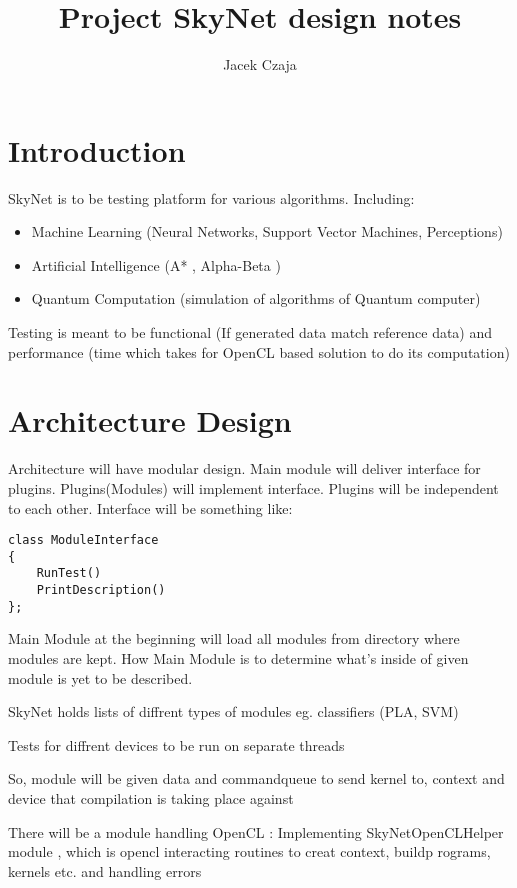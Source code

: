 \documentclass[a4paper,10pt]{article}
\title{Project SkyNet design notes}
\author{Jacek Czaja}
\begin{document}
\maketitle

\tableofcontents

\section{Introduction}
SkyNet is to be testing platform for various algorithms. Including:
\begin{itemize}
\item Machine Learning (Neural Networks, Support Vector Machines, Perceptions)
\item Artificial Intelligence (A* , Alpha-Beta )
\item Quantum Computation (simulation of algorithms of Quantum computer)
\end{itemize}

Testing is meant to be functional (If generated data match reference data) and performance (time which takes for OpenCL based solution to do its computation)

\section{Architecture Design}
Architecture will have modular design.
Main module will deliver interface for plugins.
Plugins(Modules) will implement interface.
Plugins will be independent to each other.
Interface will be something like:
\begin{verbatim}
class ModuleInterface
{
    RunTest()
    PrintDescription()
};
\end{verbatim}

Main Module at the beginning will load all modules from directory where modules are kept.
How Main Module is to determine what's inside of given module is  yet to be described.

SkyNet holds lists of diffrent types of modules eg. classifiers (PLA, SVM)

Tests for diffrent devices to be run on separate threads

So, module will be given data and commandqueue to send kernel to, context and device that compilation is taking place against

There will be a module handling OpenCL :
Implementing SkyNetOpenCLHelper module , which is opencl interacting routines to creat context, buildp rograms, kernels etc. and handling errors
\end{document}
